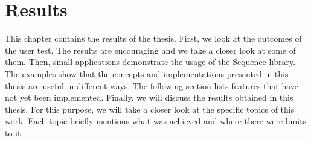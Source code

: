 \chapter{Results}
This chapter contains the results of the thesis. First, we look at the outcomes of the user test.
The results are encouraging and we take a closer look at some of them.
Then, small applications demonstrate the usage of the Sequence library. The
examples show that the concepts and implementations presented in this thesis
are useful in different ways. The following section lists features that have not yet been
implemented. Finally, we will discuss the results obtained in this thesis. For
this purpose, we will take a closer look at the specific topics of this work.
Each topic briefly mentions what was achieved and where there were limits to
it.




